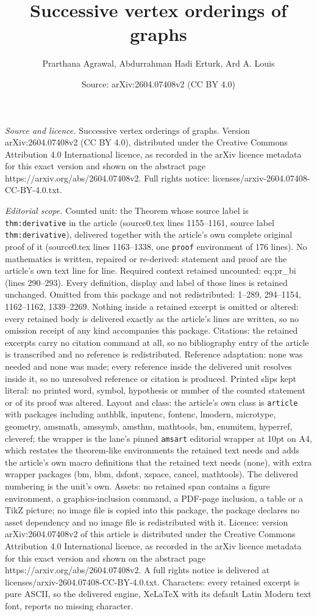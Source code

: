 \documentclass[10pt,a4paper]{amsart}
\title[Successive vertex orderings of graphs]{Successive vertex orderings of graphs}
\author{Prarthana Agrawal, Abdurrahman Hadi Erturk, Ard A. Louis}
\date{Source: arXiv:2604.07408v2 (CC BY 4.0)}
\begin{document}
\maketitle

\noindent\emph{Source and licence.} Successive vertex orderings of graphs. Version arXiv:2604.07408v2 (CC BY 4.0), distributed under the Creative Commons Attribution 4.0 International licence, as recorded in the arXiv licence metadata for this exact version and shown on the abstract page https://arxiv.org/abs/2604.07408v2. Full rights notice: licenses/arxiv-2604.07408-CC-BY-4.0.txt.\par\smallskip

\noindent\textit{Editorial scope.} Counted unit: the Theorem whose source label is \texttt{thm:derivative} in the article (source0.tex lines 1155--1161, source label \texttt{thm:derivative}), delivered together with the article's own complete original proof of it (source0.tex lines 1163--1338, one \texttt{proof} environment of 176 lines). No mathematics is written, repaired or re-derived: statement and proof are the article's own text line for line. Required context retained uncounted: eq:pr\_bi (lines 290--293). Every definition, display and label of those lines is retained unchanged. Omitted from this package and not redistributed: 1--289, 294--1154, 1162--1162, 1339--2269. Nothing inside a retained excerpt is omitted or altered: every retained body is delivered exactly as the article's lines are written, so no omission receipt of any kind accompanies this package. Citations: the retained excerpts carry no citation command at all, so no bibliography entry of the article is transcribed and no reference is redistributed. Reference adaptation: none was needed and none was made; every reference inside the delivered unit resolves inside it, so no unresolved reference or citation is produced. Printed slips kept literal: no printed word, symbol, hypothesis or number of the counted statement or of its proof was altered. Layout and class: the article's own class is \texttt{article} with packages including authblk, inputenc, fontenc, lmodern, microtype, geometry, amsmath, amssymb, amsthm, mathtools, bm, enumitem, hyperref, cleveref; the wrapper is the lane's pinned \texttt{amsart} editorial wrapper at 10pt on A4, which restates the theorem-like environments the retained text needs and adds the article's own macro definitions that the retained text needs (none), with extra wrapper packages (bm, bbm, dsfont, xspace, cancel, mathtools). The delivered numbering is the unit's own. Assets: no retained span contains a figure environment, a graphics-inclusion command, a PDF-page inclusion, a table or a TikZ picture; no image file is copied into this package, the package declares no asset dependency and no image file is redistributed with it. Licence: version arXiv:2604.07408v2 of this article is distributed under the Creative Commons Attribution 4.0 International licence, as recorded in the arXiv licence metadata for this exact version and shown on the abstract page https://arxiv.org/abs/2604.07408v2. A full rights notice is delivered at licenses/arxiv-2604.07408-CC-BY-4.0.txt. Characters: every retained excerpt is pure ASCII, so the delivered engine, XeLaTeX with its default Latin Modern text font, reports no missing character.
\end{document}
